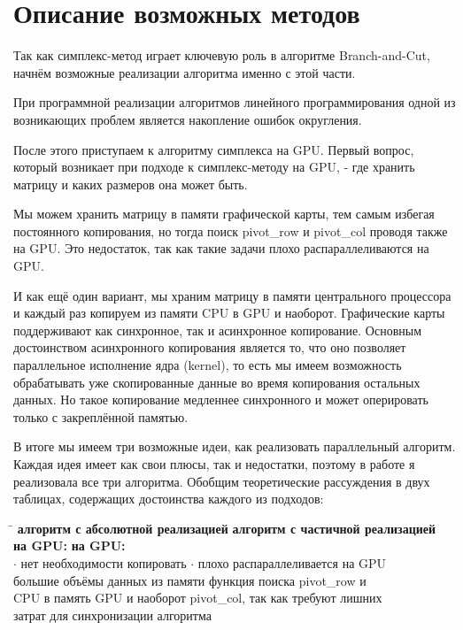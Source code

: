\documentclass[a4paper,14pt,russian]{extreport}
\begin{document}
\section{Описание возможных методов}

Так как симплекс-метод играет ключевую роль в алгоритме Branch-and-Cut, начнём возможные реализации алгоритма именно с этой части.  
\par
При программной реализации алгоритмов линейного программирования одной из возникающих проблем является накопление ошибок округления. 
\par
После этого приступаем к алгоритму симплекса на GPU. Первый вопрос, который возникает при подходе к симплекс-методу на GPU, - где хранить матрицу и каких размеров она может быть. 
\par
Мы можем хранить матрицу в памяти графической карты, тем самым избегая постоянного копирования, но тогда поиск pivot\_row и pivot\_col проводя также на GPU. Это недостаток, так как такие задачи плохо распараллеливаются на GPU. 
\par
И как ещё один вариант, мы храним матрицу в памяти центрального процессора и каждый раз копируем из памяти CPU в GPU и наоборот. Графические карты поддерживают как синхронное, так и асинхронное копирование.  Основным достоинством асинхронного копирования является то, что оно позволяет параллельное исполнение ядра (kernel), то есть мы имеем возможность обрабатывать уже скопированные данные во время копирования остальных данных. Но такое копирование медленнее синхронного и может оперировать только с закреплённой памятью. 
\par
В итоге мы имеем три возможные идеи, как реализовать параллельный алгоритм. Каждая идея имеет как свои плюсы, так и недостатки, поэтому в работе я реализовала все три алгоритма. Обобщим теоретические рассуждения в двух таблицах, содержащих достоинства каждого из подходов:
\par
\begin{tabbing}
\hspace{0.5\textwidth} \= \hspace{0.5\textwidth} \kill
{\bf алгоритм с абсолютной реализацией} \> {\bf алгоритм с частичной реализацией} \\ 
{\bf на GPU:} \> {\bf на GPU:} \\
$\cdot$ нет необходимости копировать  \> $\cdot$ плохо распараллеливается на GPU  \\
большие объёмы данных из памяти  \> функция поиска pivot\_row и \\
CPU в память GPU и наоборот \> pivot\_col, так как требуют лишних  \\
 \> затрат для синхронизации алгоритма \\
\end{tabbing}
 
\end{document}
